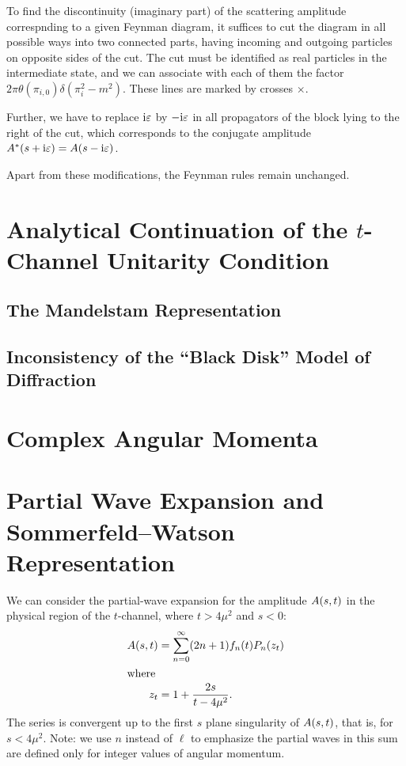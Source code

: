 To find the discontinuity (imaginary part) of the scattering amplitude
correspnding to a given Feynman diagram, it suffices to cut the diagram
in all possible ways into two connected parts, having incoming and
outgoing particles on opposite sides of the cut. The cut must be
identified as real particles in the intermediate state, and we can
associate with each of them the factor $2\pi\theta(\pi_{i,0})\delta(\pi_{i}^{2}-m^{2})$.
These lines are marked by crosses $\times$.

Further, we have to replace $\mathrm{i}\varepsilon$ by $-\mathrm{i}\varepsilon$ in all
propagators of the block lying to the right of the cut, which
corresponds to the conjugate amplitude $A^{*}(s+\mathrm{i}\varepsilon)=A(s-\mathrm{i}\varepsilon)$.

Apart from these modifications, the Feynman rules remain unchanged.

\section{Analytical Continuation of the \texorpdfstring{$t$}{t}-Channel Unitarity Condition}

\subsection{The Mandelstam Representation}

\subsection{Inconsistency of the ``Black Disk'' Model of Diffraction}

\section{Complex Angular Momenta}


\section{Partial Wave Expansion and Sommerfeld--Watson Representation}

\M We can consider the partial-wave expansion for the amplitude
$A(s,t)$ in the physical region of the $t$-channel, where
$t>4\mu^{2}$ and $s<0$:
\begin{subequations}
  \begin{align}
    A(s,t) &= \sum^{\infty}_{n=0}(2n+1)f_{n}(t)P_{n}(z_{t})\\
    \intertext{where}
    z_{t} &= 1 + \frac{2s}{t-4\mu^{2}}.
  \end{align}
\end{subequations}
The series is convergent up to the first $s$ plane singularity of
$A(s,t)$, that is, for $s<4\mu^{2}$. Note: we use $n$
instead of $\ell$ to emphasize the partial waves in this sum are defined
only for integer values of angular momentum.

